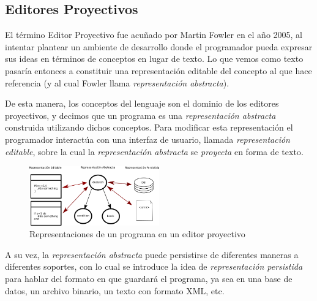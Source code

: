 \subsection{Editores Proyectivos}

El término Editor Proyectivo fue acuñado por Martin Fowler en el año 2005\cite{Fowler}, al intentar plantear un ambiente de desarrollo donde el programador pueda expresar sus ideas en términos de conceptos en lugar de texto. Lo que vemos como texto pasaría entonces a constituir una representación editable del concepto al que hace referencia (y al cual Fowler llama \textit{representación abstracta}).

De esta manera, los conceptos del lenguaje son el dominio de los editores proyectivos, y decimos que un programa es una \textit{representación abstracta} construida utilizando dichos conceptos. Para modificar esta representación el programador interactúa con una interfaz de usuario, llamada \textit{representación editable}, sobre la cual la \textit{representación abstracta} se \textit{proyecta} en forma de texto\cite{voelter2014projectional}. 

\begin{figure}
  \begin{center}
    \includegraphics[width=0.5\textwidth,keepaspectratio]{assets/projectional-editor.png}
    \caption{Representaciones de un programa en un editor proyectivo}
  \end{center}
\end{figure}

A su vez, la \textit{representación abstracta} puede persistirse de diferentes maneras a diferentes soportes, con lo cual se introduce la idea de \textit{representación persistida} para hablar del formato en que guardará el programa, ya sea en una base de datos, un archivo binario, un texto con formato XML, etc.


